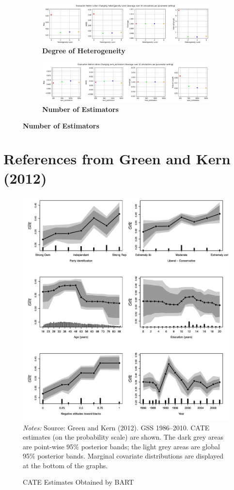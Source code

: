 \documentclass[12pt]{article}
\begin{document}
\begin{figure}
\ContinuedFloat
	\begin{subfigure} [!ht] {\linewidth}
		\caption{\textbf{Degree of Heterogeneity}}
   	 	\includegraphics[width = \linewidth]{Graphs/s2_hetero.png}
	\end{subfigure}
	\begin{subfigure} [!ht] {\linewidth}
\vspace{0.5cm}
		\caption{\textbf{Number of Estimators}}
   	 	\includegraphics[width = \linewidth]{Graphs/s2_nestimator.png}
	\end{subfigure}
\end{figure} 

\clearpage




\clearpage
\appendix
\section{References from Green and Kern (2012) }

\begin{figure}[!ht]
\renewcommand{\thefigure}{A1}
\caption{CATE Estimates Obtained by BART}
	\centering
   	 	\includegraphics[width = 0.6\linewidth]{Graphs/A_GK_cate.png} \\
\footnotesize
\emph{Notes:} Source: Green and Kern (2012). GSS 1986–2010. CATE estimates (on the probability scale) are shown. The dark grey areas are point-wise 95\% posterior bands; the light grey areas are global 95\% posterior bands. Marginal covariate distributions are displayed at the bottom of the graphs.
\end{figure} 
\end{document}
